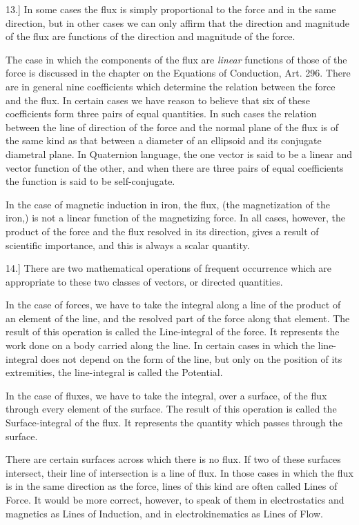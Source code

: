 \documentclass[11pt,a4paper]{article}
\begin{document}
13.] In some cases the flux is simply proportional to the force and in
the same direction, but in other cases we can only affirm that the
direction and magnitude of the flux are functions of the direction and
magnitude of the force.

\clearpage

The case in which the components of the flux are \textit{linear}
functions of those of the force is discussed in the chapter on the
Equations of Conduction, Art. 296. There are in general nine
coefficients which determine the relation between the force and the
flux. In certain cases we have reason to believe that six of these
coefficients form three pairs of equal quantities. In such cases the
relation between the line of direction of the force and the normal plane
of the flux is of the same kind as that between a diameter of an
ellipsoid and its conjugate diametral plane. In Quaternion language, the
one vector is said to be a linear and vector function of the other, and
when there are three pairs of equal coefficients the function is said to
be self-conjugate.

In the case of magnetic induction in iron, the flux, (the magnetization
of the iron,) is not a linear function of the magnetizing force. In all
cases, however, the product of the force and the flux resolved in its
direction, gives a result of scientific importance, and this is always a
scalar quantity.

14.] There are two mathematical operations of frequent occurrence which
are appropriate to these two classes of vectors, or directed quantities.

In the case of forces, we have to take the integral along a line of the
product of an element of the line, and the resolved part of the force
along that element. The result of this operation is called the
Line-integral of the force. It represents the work done on a body
carried along the line. In certain cases in which the line-integral does
not depend on the form of the line, but only on the position of its
extremities, the line-integral is called the Potential.

In the case of fluxes, we have to take the integral, over a surface, of
the flux through every element of the surface. The result of this
operation is called the Surface-integral of the flux. It represents the
quantity which passes through the surface.

There are certain surfaces across which there is no flux. If two of
these surfaces intersect, their line of intersection is a line of flux.
In those cases in which the flux is in the same direction as the force,
lines of this kind are often called Lines of Force. It would be more
correct, however, to speak of them in electrostatics and magnetics as
Lines of Induction, and in electrokinematics as Lines of Flow.
\end{document}

